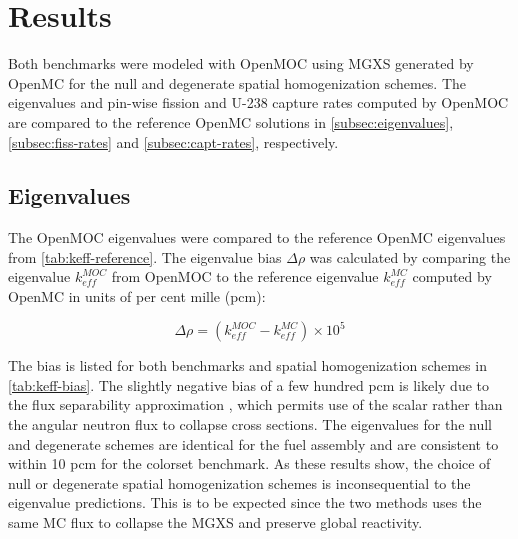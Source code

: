 \section{Results}
\label{sec:results}

Both benchmarks were modeled with OpenMOC using MGXS generated by OpenMC for the null and degenerate spatial homogenization schemes. The eigenvalues and pin-wise fission and U-238 capture rates computed by OpenMOC are compared to the reference OpenMC solutions in \autoref{subsec:eigenvalues}, \autoref{subsec:fiss-rates} and \autoref{subsec:capt-rates}, respectively.


\subsection{Eigenvalues}
\label{subsec:eigenvalues}

The OpenMOC eigenvalues were compared to the reference OpenMC eigenvalues from \autoref{tab:keff-reference}. The eigenvalue bias $\Delta\rho$ was calculated by comparing the eigenvalue $k_{eff}^{MOC}$ from OpenMOC to the reference eigenvalue $k_{eff}^{MC}$ computed by OpenMC in units of per cent mille (pcm):

\begin{equation}
\label{eqn:delta-rho}
\Delta\rho = \left(k_{eff}^{MOC} - k_{eff}^{MC}\right) \times 10^{5}
\end{equation}

The bias is listed for both benchmarks and spatial homogenization schemes in \autoref{tab:keff-bias}. The slightly negative bias of a few hundred pcm is likely due to the flux separability approximation \citep{boyd2018sph}, which permits use of the scalar rather than the angular neutron flux to collapse cross sections. The eigenvalues for the null and degenerate schemes are identical for the fuel assembly and are consistent to within 10 pcm for the colorset benchmark. As these results show, the choice of null or degenerate spatial homogenization schemes is inconsequential to the eigenvalue predictions. This is to be expected since the two methods uses the same MC flux to collapse the MGXS and preserve global reactivity.


